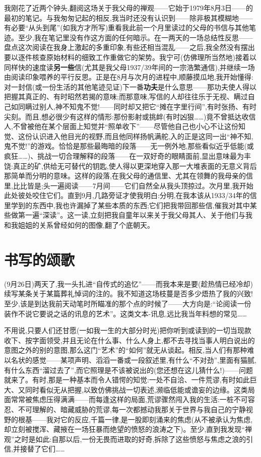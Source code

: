 我刚花了近两个钟头,翻阅这场关于我父母的禅观——它始于1979年8月3日——的最初的笔记。与我匆匆记起的相反,我当时还没有认识到——除非极其模糊地——有必要“从头到尾”(如我方才所写)重看我此前一个月里读过的父母的书信与其他笔迹。至少,我在笔记里没有作这方面的任何暗示。在一两天的一场总结性反思——盘点这次阅读在我身上激起的多重印象,有些还相当混乱——之后,我全然没有摆出要以逐件核查原始材料的细致工作重做它的架势。我宁可(仿佛理所当然地)接着以同样快的速度读\textbf{另一些}信(尤其是我父母1937/39年间的一宗浩繁通信),并继续一场由阅读印象喂养的平行反思。正是在8月与次月的进程中,顺藤摸瓜地,我开始懂得:对一封信(或一份生活的其他笔迹见证)下一番\textbf{功夫}是什么意思——那功夫使人得以把握其真正的、有时昭然若揭的意味;而那意味,写信的人却往往乐于无视、瞒过自己如同瞒过别人,神不知鬼不觉!——同时却又把它“摊在字里行间”,有时张扬、有时尖刻。而且,想必很少有这样的情形:那份影射或挑衅(有时凶狠……)竟不曾抵达收信人,不曾被他在某个层面上知觉并“照单收下”——尽管他自己也小心不让这份知觉、这份认识进入他目光的视野,而且他同样扬帆满舵,入的正是这同一出“神不知,鬼不觉!”的游戏。恰恰是那些最晦暗的段落——无一例外地,那些看似近乎低能(或疯狂……)、挑战一切合理解释的段落——在一双好奇的眼睛面前,显出意味最为丰饶:真正的矿,供给无可替代的钥匙,使人得以更深地穿入那一大堆表面的无意义背后那简单而分明的意味。这样的段落,在我父母的通信里、尤其在领舞的我母亲的信里,比比皆是;头一遍阅读——7月间——它们自然全从我头顶掠过。次月里,我开始此处彼处咬住它们。直到9月,几路旁证才使我明白:分明,在我本该从1933/34年的信里学到的东西中,我也许漏掉了某些本质的东西;它们把我带回那些信,催我对其中某些做第一遍“深读”。这一读,立刻把我自童年以来关于我父母其人、关于他们与我和我姐姐的关系曾经如何的图像,翻了个底朝天。

\section{书写的颂歌}


(9月26日)两天了,我一头扎进“自传式的追忆”——而我本来是要(趁热情已经冷却)续写某条关于某篇葬礼悼词的注的。我不知道这场枝蔓是否多少焐热了我的兴致!至少,该是到达我前天动笔时所瞄准的那个点的时候了——大方向是:“论阅读一份装作不说它要说之话的讯息的艺术”。\dmark{}这类文本-讯息,远比我当年料想的常见……

不用说,只要人们还甘愿(一如我一生的大部分时光)把你听到或读到的一切当现款收下、按字面领受,并且无论在什么事、什么人身上,都不去寻找当事人明白说出的意图之外的别的意图,那么这门“艺术”的“如何”就无从谈起。相反,当人们有那种难以名状的感觉——某项声明、滔滔一番或一段叙述里,有什么“不对劲”,里面有猫腻,有什么东西“溜过去了”,而它照理是不该被说出的(您还想在这儿猜什么!)——问题就来了。有时,那是一种基本而令人错愕的知觉:一处不自洽、一件荒谬,有时如此巨大、又同时看似无从把握,以致仿佛挑战一切表述,濒临低能或谵妄的边缘。这类局面常常被焦虑压得满满——而每逢这样的局面,荒谬骤然闯入我的生活:一桩不可容忍、不可理解的、暗藏威胁的荒谬,每一次都撼动我那关于世界与我自己的宁静视野的根基——我对它的反应,千篇一律,是一股即刻涌来的焦虑(从不被承认为焦虑,却立刻被搅浑、藏掖在一场狂暴而绝望的愤怒的浪涛之下)。至少,直到我发现“禅观”之时是如此:自那以后,一份无畏而进取的好奇,拆除了这些愤怒与焦虑之浪的引信,并接替了它们……

